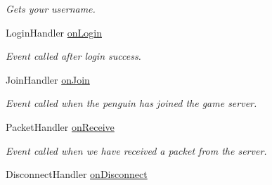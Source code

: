 \begin{DoxyCompactItemize}
\begin{DoxyCompactList}\small\item\em Gets your username. \end{DoxyCompactList}\item 
\hypertarget{classSharpenguin_1_1PenguinBase_a370b4ae2070f96b55fbef267d4d6b27e}{Login\-Handler \hyperlink{classSharpenguin_1_1PenguinBase_a370b4ae2070f96b55fbef267d4d6b27e}{on\-Login}}\label{classSharpenguin_1_1PenguinBase_a370b4ae2070f96b55fbef267d4d6b27e}

\begin{DoxyCompactList}\small\item\em Event called after login success. \end{DoxyCompactList}\item 
\hypertarget{classSharpenguin_1_1PenguinBase_a671a22a751f91b472db6f427c618c131}{Join\-Handler \hyperlink{classSharpenguin_1_1PenguinBase_a671a22a751f91b472db6f427c618c131}{on\-Join}}\label{classSharpenguin_1_1PenguinBase_a671a22a751f91b472db6f427c618c131}

\begin{DoxyCompactList}\small\item\em Event called when the penguin has joined the game server. \end{DoxyCompactList}\item 
\hypertarget{classSharpenguin_1_1PenguinBase_ac2b810a66bab0069126d07ebe0ccfa42}{Packet\-Handler \hyperlink{classSharpenguin_1_1PenguinBase_ac2b810a66bab0069126d07ebe0ccfa42}{on\-Receive}}\label{classSharpenguin_1_1PenguinBase_ac2b810a66bab0069126d07ebe0ccfa42}

\begin{DoxyCompactList}\small\item\em Event called when we have received a packet from the server. \end{DoxyCompactList}\item 
\hypertarget{classSharpenguin_1_1PenguinBase_a11a9cb86a237e4aff2903c84cbc0d26f}{Disconnect\-Handler \hyperlink{classSharpenguin_1_1PenguinBase_a11a9cb86a237e4aff2903c84cbc0d26f}{on\-Disconnect}}\label{classSharpenguin_1_1PenguinBase_a11a9cb86a237e4aff2903c84cbc0d26f}


\end{DoxyCompactItemize}
